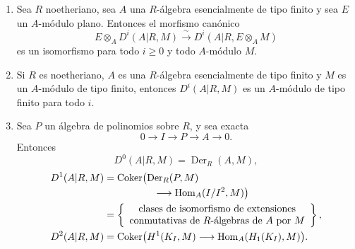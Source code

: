 \begin{enumerate}[label=(\arabic*)]

\item Sea $R$ noetheriano, sea $A$ una $R$-álgebra esencialmente de
tipo finito y sea $E$ un $A$-módulo plano. Entonces el morfismo canónico
\[
 E\otimes_AD^i(A|R,M)
 \xrightarrow{\ \sim\ }
 D^i(A|R,E\otimes_AM)
\]
es un isomorfismo para todo $i\geq0$ y todo $A$-módulo $M$.

\item Si $R$ es noetheriano, $A$ es una $R$-álgebra esencialmente de
tipo finito y $M$ es un $A$-módulo de tipo finito, entonces
$D^i(A|R,M)$ es un $A$-módulo de tipo finito para todo $i$.

\item Sea $P$ un álgebra de polinomios sobre $R$, y sea exacta
\[
 0\longrightarrow I\longrightarrow P\longrightarrow A
 \longrightarrow0.
\]
Entonces
\[
 D^0(A|R,M)=\operatorname{Der}_R(A,M),
\]
\begin{align*}
D^1(A|R,M)
 &=\operatorname{Coker}\bigl(
   \operatorname{Der}_R(P,M)\\[-.25ex]
 &\hspace{5em}\longrightarrow
   \operatorname{Hom}_A(I/I^2,M)\bigr)\\
 &=\left\{
   \begin{array}{c}
   \text{clases de isomorfismo de extensiones}\\
   \text{conmutativas de }R\text{-álgebras de }A\text{ por }M
   \end{array}\right\},\\
D^2(A|R,M)
 &=\operatorname{Coker}\bigl(
   H^1(K_I,M)\longrightarrow
   \operatorname{Hom}_A(H_1(K_I),M)\bigr).
\end{align*}
\end{enumerate}
